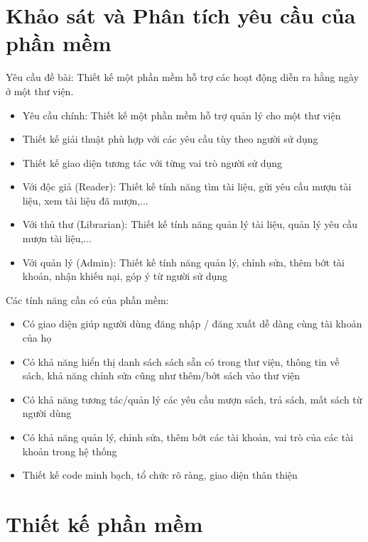 \documentclass[a4paper]{article}
\begin{document}
\section{Khảo sát và Phân tích yêu cầu của phần mềm}
Yêu cầu đề bài: Thiết kế một phần mềm hỗ trợ các hoạt động diễn ra hằng ngày ở một thư viện.
\begin{itemize}
\item Yêu cầu chính: Thiết kế một phần mềm hỗ trợ quản lý cho một thư viện
\item Thiết kế giải thuật phù hợp với các yêu cầu tùy theo người sử dụng
\item Thiết kế giao diện tương tác với từng vai trò người sử dụng
\item Với độc giả (Reader): Thiết kế tính năng tìm tài liệu, gửi yêu cầu mượn tài liệu, xem tài liệu đã mượn,...
\item Với thủ thư (Librarian): Thiết kế tính năng quản lý tài liệu, quản lý yêu cầu mượn tài liệu,...
\item Với quản lý (Admin): Thiết kế tính năng quản lý, chỉnh sửa, thêm bớt tài khoản, nhận khiếu nại, góp ý từ người sử dụng
\end{itemize}
Các tính năng cần có của phần mềm:
\begin{itemize}
\item Có giao diện giúp người dùng đăng nhập / đăng xuất dễ dàng cùng tài khoản của họ
\item Có khả năng hiển thị danh sách sách sẵn có trong thư viện, thông tin về sách, khả năng chỉnh sửa cũng như thêm/bớt sách vào thư viện
\item Có khả năng tương tác/quản lý các yêu cầu mượn sách, trả sách, mất sách từ người dùng
\item Có khả năng quản lý, chỉnh sửa, thêm bớt các tài khoản, vai trò của các tài khoản trong hệ thống
\item Thiết kế code minh bạch, tổ chức rõ ràng, giao diện thân thiện
\end{itemize}


\section{Thiết kế phần mềm}
\end{document}
